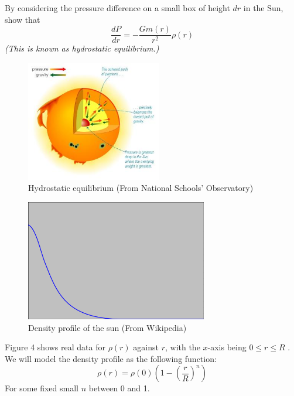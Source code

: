 \documentclass{exam}
\begin{document}
\vspace{5pt}
\begin{questions}
    \setcounter{question}{10}

    \question[4]
    By considering the pressure difference on a small box of height $dr$ in the Sun, show that
    \begin{equation}
        \frac{dP}{dr} = -\frac{Gm(r)}{r^2} \rho(r)
    \end{equation}
    \textit{(This is known as hydrostatic equilibrium.)}
    \begin{figure}[h]
        \centering
        \includegraphics[height=150pt]{hydrostaticeqm}
        \caption{Hydrostatic equilibrium (From National Schools' Observatory)}
    \end{figure}

    \newpage
    \begin{figure}[h]
        \centering
        \includegraphics[height=150pt]{sundensityprofile}
        \caption{Density profile of the sun (From Wikipedia)}
    \end{figure}

    Figure 4 shows real data for $\rho(r)$ against $r$, with the $x$-axis being $ 0 \leq r \leq R$ .
    We will model the density profile as the following function:
    $$ \rho(r) = \rho(0)\left(1-\left(\frac{r}{R}\right)^n\right) $$
    For some fixed small $n$ between 0 and 1.
    \question
    \begin{parts}

\end{parts}
\end{questions}
\end{document}
